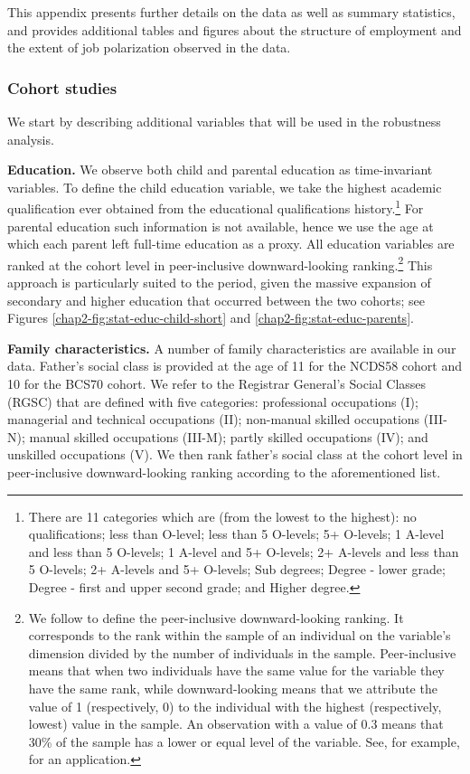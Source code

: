 This appendix presents further details on the data as well as summary statistics, and provides additional tables and figures about the structure of employment and the extent of job polarization observed in the data. 

\subsubsection{Cohort studies}\label{chap2-app-data-cohort}

We start by describing additional variables that will be used in the robustness analysis. 

\textbf{Education.} We observe both child and parental education as time-invariant variables. To define the child education variable, we take the highest academic qualification ever obtained from the educational qualifications history.\footnote{There are 11 categories which are (from the lowest to the highest): no qualifications; less than O-level; less than 5 O-levels; 5+ O-levels; 1 A-level and less than 5 O-levels; 1 A-level and 5+ O-levels; 2+ A-levels and less than 5 O-levels; 2+ A-levels and 5+ O-levels; Sub degrees; Degree - lower grade; Degree - first and upper second grade; and Higher degree.} For parental education such information is not available, hence we use the age at which each parent left full-time education as a proxy. All education variables are ranked at the cohort level in peer-inclusive downward-looking ranking.\footnote{We follow \cite{Cowell2017Inequality} to define the peer-inclusive downward-looking ranking. It corresponds to the rank within the sample of an individual on the variable's dimension divided by the number of individuals in the sample. Peer-inclusive means that when two individuals have the same value for the variable they have the same rank, while downward-looking means that we attribute the value of 1 (respectively, 0) to the individual with the highest (respectively, lowest) value in the sample. An observation with a value of 0.3 means that 30\% of the sample has a lower or equal level of the variable. See, for example, \cite{Jenkins2021Inequality} for an application.} This approach is particularly suited to the period, given the massive expansion of secondary and higher education that occurred between the two cohorts; see Figures \ref{chap2-fig:stat-educ-child-short} and \ref{chap2-fig:stat-educ-parents}.

\textbf{Family characteristics.} A number of family characteristics are available in our data. Father's social class is provided at the age of 11 for the NCDS58 cohort and 10 for the BCS70 cohort. We refer to the Registrar General’s Social Classes (RGSC) that are defined with five categories: professional occupations (I); managerial and technical occupations (II); non-manual skilled occupations (III-N); manual skilled occupations (III-M); partly skilled occupations (IV); and unskilled occupations (V). We then rank father's social class at the cohort level in peer-inclusive downward-looking ranking according to the aforementioned list.

